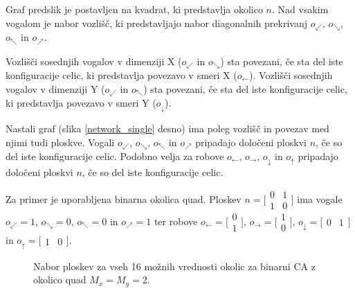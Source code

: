 \documentclass[12pt,a4paper,openany,twoside]{book}
\begin{document}
Graf predslik je postavljen na kvadrat, ki predstavlja okolico \(n\).
Nad vsakim vogalom je nabor vozlišč, ki predstavljajo nabor diagonalnih prekrivanj
\(o_{\swarrow}\), \(o_{\searrow}\), \(o_{\nwarrow}\) in \(o_{\nearrow}\).

Vozlišči sosednjih vogalov v dimenziji X (\(o_{\swarrow}\) in \(o_{\searrow}\)) sta povezani,
če sta del iste konfiguracije celic, ki predstavlja povezavo v smeri X (\(o_{\leftarrow}\)).
Vozlišči sosednjih vogalov v dimenziji Y (\(o_{\swarrow}\) in \(o_{\nwarrow}\)) sta povezani,
če sta del iste konfiguracije celic, ki predstavlja povezavo v smeri Y (\(o_{\downarrow}\)).

Nastali graf (slika \ref{network_single} desno) ima poleg vozlišč in povezav med njimi tudi ploskve.
Vogali \(o_{\swarrow}\), \(o_{\searrow}\), \(o_{\nwarrow}\) in \(o_{\nearrow}\)
pripadajo določeni ploskvi \(n\), če so del iste konfiguracije celic.
Podobno velja za robove \(o_{\leftarrow}\), \(o_{\rightarrow}\), \(o_{\downarrow}\) in \(o_{\uparrow}\)
pripadajo določeni ploskvi \(n\), če so del iste konfiguracije celic.

Za primer je uporabljena binarna okolica quad.
Ploskev \(n=\bigl[\begin{smallmatrix} 0&1 \\ 1&0 \end{smallmatrix}\bigr]\)
ima vogale \(o_{\swarrow}=1\), \(o_{\searrow}=0\), \(o_{\nwarrow}=0\) in \(o_{\nearrow}=1\) ter robove
\(o_{\leftarrow}=\bigl[\begin{smallmatrix} 0 \\ 1 \end{smallmatrix}\bigr]\),
\(o_{\rightarrow}=\bigl[\begin{smallmatrix} 1 \\ 0 \end{smallmatrix}\bigr]\),
\(o_{\downarrow}=\bigl[\begin{smallmatrix} 0 & 1 \end{smallmatrix}\bigr]\) in
\(o_{\uparrow}=\bigl[\begin{smallmatrix} 1 & 0 \end{smallmatrix}\bigr]\).

\begin{figure}[htb]
\centerline{}
\caption[Nabor ploskev.]{Nabor ploskev za vseh 16 možnih vrednosti okolic za binarni CA z okolico quad \(M_x=M_y=2\).}
\label{neighborhood_surfaces}
\end{figure}
\end{document}
